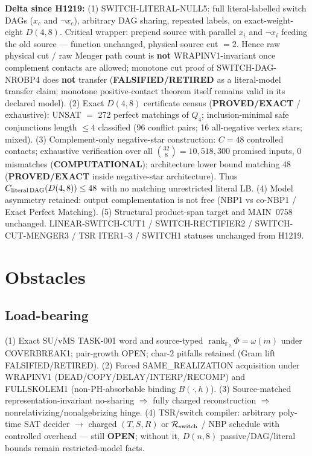 \documentclass[11pt]{article}
\begin{document}
\textbf{Delta since H1219:}
(1) SWITCH-LITERAL-NULL5: full literal-labelled switch DAGs ($x_c$ and $\neg x_c$),
arbitrary DAG sharing, repeated labels, on exact-weight-eight $D(4,8)$.
Critical wrapper: prepend source with parallel $x_i$ and $\neg x_i$ feeding the old
source --- function unchanged, physical source cut $=2$. Hence raw physical cut /
raw Menger path count is \textbf{not} WRAPINV1-invariant once complement contacts
are allowed; monotone cut proof of SWITCH-DAG-NROBP4 does \textbf{not} transfer
(\textbf{FALSIFIED/RETIRED} as a literal-model transfer claim; monotone positive-contact
theorem itself remains valid in its declared model).
(2) Exact $D(4,8)$ certificate census (\textbf{PROVED/EXACT} / exhaustive):
UNSAT $=$ 272 perfect matchings of $Q_4$; inclusion-minimal safe conjunctions
length $\le 4$ classified (96 conflict pairs; 16 all-negative vertex stars; mixed).
(3) Complement-only negative-star construction: $C=48$ controlled contacts;
exhaustive verification over all $\binom{32}{8}=10{,}518{,}300$ promised inputs,
0 mismatches (\textbf{COMPUTATIONAL}); architecture lower bound matching 48
(\textbf{PROVED/EXACT} inside negative-star architecture).
Thus $C_{\rm literal\,DAG}(D(4,8))\le 48$ with no matching unrestricted literal LB.
(4) Model asymmetry retained: output complementation is not free (NBP1 vs co-NBP1 /
Exact Perfect Matching).
(5) Structural product-span target and MAIN~0758 unchanged.
LINEAR-SWITCH-CUT1 / SWITCH-RECTIFIER2 / SWITCH-CUT-MENGER3 / TSR ITER1--3 / SWITCH1
statuses unchanged from H1219.

\section*{Obstacles}
\subsection*{Load-bearing}
(1) Exact SU/vMS TASK-001 word and source-typed
$\operatorname{rank}_{\mathbb F_2}\Phi=\omega(m)$ under COVERBREAK1; pair-growth OPEN;
char-$2$ pitfalls retained (Gram lift FALSIFIED/RETIRED).
(2) Forced SAME\_REALIZATION acquisition under WRAPINV1
(DEAD/COPY/DELAY/INTERP/RECOMP) and FULLSKOLEM1 (non-PH-absorbable binding $B(\cdot,h)$).
(3) Source-matched representation-invariant no-sharing $\Rightarrow$ fully charged reconstruction
$\Rightarrow$ nonrelativizing/nonalgebrizing hinge.
(4) TSR/switch compiler: arbitrary poly-time SAT decider $\to$ charged $(T,S,R)$ or
$\mathcal R_{\rm switch}$ / NBP schedule with controlled overhead --- still \textbf{OPEN};
without it, $D(n,8)$ passive/DAG/literal bounds remain restricted-model facts.
\end{document}
